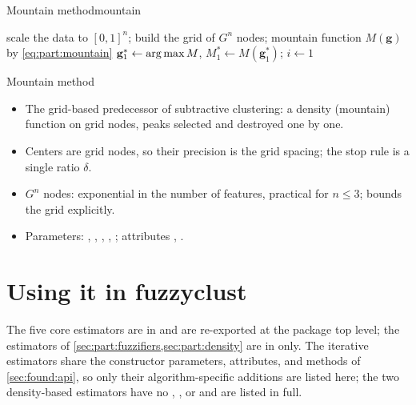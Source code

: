 \begin{algobox}{Mountain method}{mountain}
\begin{algorithm}[H]
scale the data to $[0,1]^n$; build the grid of $G^n$ nodes; mountain function $M(\mathbf{g})$ by \eqref{eq:part:mountain}\;
$\mathbf{g}^*_1\leftarrow\operatorname{arg\,max} M$, $M^*_1\leftarrow M(\mathbf{g}^*_1)$; $i\leftarrow1$\;
\end{algorithm}
\end{algobox}
\begin{summarybox}{Mountain method}
\begin{itemize}
  \item The grid-based predecessor of subtractive clustering: a density (mountain) function on grid nodes, peaks selected and destroyed one by one.
  \item Centers are grid nodes, so their precision is the grid spacing; the stop rule is a single ratio $\delta$.
  \item $G^n$ nodes: exponential in the number of features, practical for $n\le3$;  bounds the grid explicitly.
  \item Parameters: , , , , ; attributes , .
\end{itemize}
\end{summarybox}

\section{Using it in fuzzyclust}\label{sec:part:api}

The five core estimators are in  and are re-exported at the package top level; the estimators of \cref{sec:part:fuzzifiers,sec:part:density} are in  only. The iterative estimators share the constructor parameters, attributes, and methods of \cref{sec:found:api}, so only their algorithm-specific additions are listed here; the two density-based estimators have no , , or  and are listed in full.

